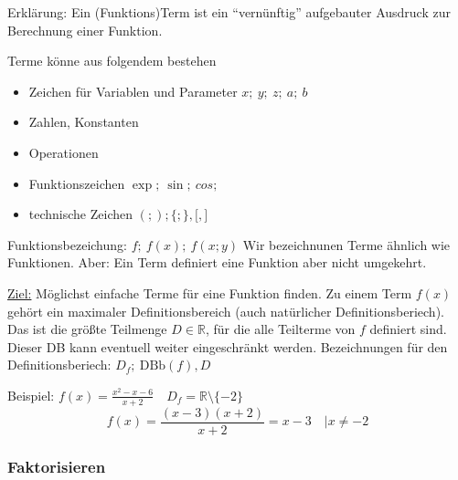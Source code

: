 Erklärung: Ein (Funktions)Term ist ein ``vernünftig'' aufgebauter Ausdruck zur Berechnung einer Funktion.

Terme könne aus folgendem bestehen
\begin{itemize}
    \item Zeichen für Variablen und Parameter $x;\ y;\ z;\ a;\ b$
    \item Zahlen, Konstanten
    \item Operationen
    \item Funktionszeichen $\exp;\ \sin;\ cos;\ $
    \item technische Zeichen $(;);\lbrace;\rbrace,\lbrack,\rbrack$
\end{itemize}
Funktionsbezeichung: $f;\ f(x);\ f(x;y)$ Wir bezeichnunen Terme ähnlich wie Funktionen.
Aber: Ein Term definiert eine Funktion aber nicht umgekehrt.


\underline{Ziel:} Möglichst einfache Terme für eine Funktion finden.
Zu einem Term $f(x)$ gehört ein maximaler Definitionsbereich (auch natürlicher Definitionsberiech).
Das ist die größte Teilmenge $D \in \mathbb{R}$, für die alle Teilterme von $f$ definiert sind.
Dieser DB kann eventuell weiter eingeschränkt werden.
Bezeichnungen für den Definitionsberiech: $D_f;\ \textrm{DBb}(f), D$


Beispiel: $f(x) = \frac{x^2-x-6}{x+2}\quad D_f=\mathbb{R}\setminus\lbrace-2\rbrace$
\[f(x)= \frac{(x-3)(x+2)}{x+2} = x-3\quad | x \not = -2\]

\subsubsection{Faktorisieren}

